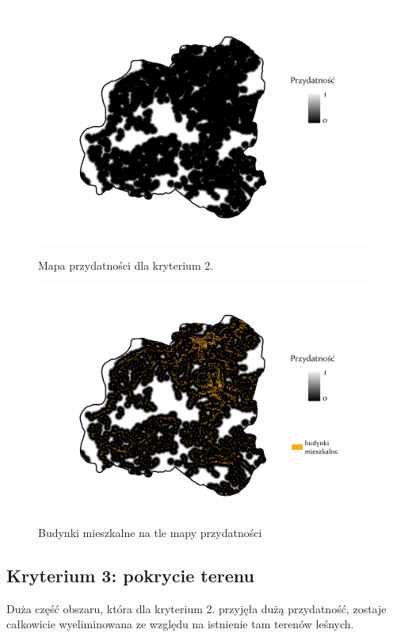 \documentclass{article}
\begin{document}
\begin{figure}[H]
    \begin{minipage}[t]{0.48\textwidth}
        \centering
        \includegraphics[width=\linewidth]{img/plesna-kryterium2-layout.jpg}
        \caption{Mapa przydatności dla kryterium 2.}
        \label{fig:kryterium2-layout}
    \end{minipage}
    \hfill
    \begin{minipage}[t]{0.48\textwidth}
        \centering
        \includegraphics[width=\linewidth]{img/plesna-kryterium2-budynki.jpg}
        \caption{Budynki mieszkalne na tle mapy przydatności}
        \label{fig:kryterium2-budynki}
    \end{minipage}
\end{figure}


\subsection{Kryterium 3: pokrycie terenu}
Duża część obszaru, która dla kryterium 2. przyjęła dużą przydatność, zostaje całkowicie wyeliminowana ze względu na istnienie tam terenów leśnych.
\end{document}
